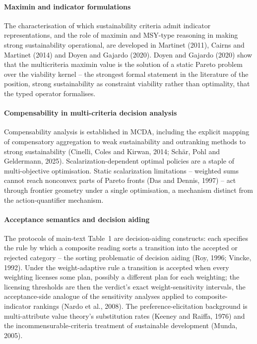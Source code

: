 \documentclass[preprint,11pt,authoryear]{elsarticle}
\theoremstyle{remark}
\begin{document}
\paragraph{Maximin and indicator formulations} The characterisation of which sustainability criteria admit indicator representations, and the role of maximin and MSY-type reasoning in making strong sustainability operational, are developed in Martinet (2011), Cairns and Martinet (2014) and Doyen and Gajardo (2020). Doyen and Gajardo (2020) show that the multicriteria maximin value is the solution of a static Pareto problem over the viability kernel -- the strongest formal statement in the literature of the position, strong sustainability as constraint viability rather than optimality, that the typed operator formalises.

\paragraph{Compensability in multi-criteria decision analysis} Compensability analysis is established in MCDA, including the explicit mapping of compensatory aggregation to weak sustainability and outranking methods to strong sustainability (Cinelli, Coles and Kirwan, 2014; Sch\"ar, Pohl and Geldermann, 2025). Scalarization-dependent optimal policies are a staple of multi-objective optimisation. Static scalarization limitations -- weighted sums cannot reach nonconvex parts of Pareto fronts (Das and Dennis, 1997) -- act through frontier geometry under a single optimisation, a mechanism distinct from the action-quantifier mechanism.

\paragraph{Acceptance semantics and decision aiding} The protocols of main-text Table~1 are decision-aiding constructs: each specifies the rule by which a composite reading sorts a transition into the accepted or rejected category -- the sorting problematic of decision aiding (Roy, 1996; Vincke, 1992). Under the weight-adaptive rule a transition is accepted when every weighting licenses some plan, possibly a different plan for each weighting; the licensing thresholds are then the verdict's exact weight-sensitivity intervals, the acceptance-side analogue of the sensitivity analyses applied to composite-indicator rankings (Nardo et al., 2008). The preference-elicitation background is multi-attribute value theory's substitution rates (Keeney and Raiffa, 1976) and the incommensurable-criteria treatment of sustainable development (Munda, 2005).
\end{document}
